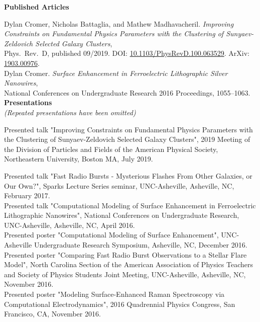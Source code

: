 \documentclass[letterpaper, 11pt]{article}
\newcommand{\noi}{\noindent}
\newcommand{\ind}{\indent}
\begin{document}
\noi \textbf{Published Articles}

\noi Dylan Cromer, Nicholas Battaglia, and Mathew Madhavacheril. \emph{Improving Constraints on Fundamental Physics Parameters with the Clustering of Sunyaev-Zeldovich Selected Galaxy Clusters},
\\
\ind Phys.\ Rev.\ D, published 09/2019. DOI: \href{https://doi.org/10.1103/PhysRevD.100.063529}{10.1103/PhysRevD.100.063529}. ArXiv: \href{https://arxiv.org/abs/1903.00976}{1903.00976}.
\\

\noi Dylan Cromer. \emph{Surface Enhancement in Ferroelectric Lithographic Silver Nanowires}, 
\\
	\ind National Conferences on Undergraduate Research 2016 Proceedings, 1055--1063.
\\

\noi \textbf{Presentations}
\\
\emph{(Repeated presentations have been omitted)}

\noi Presented talk "Improving Constraints on Fundamental Physics Parameters with the Clustering of Sunyaev-Zeldovich Selected Galaxy Clusters", 2019 Meeting of the Division of Particles and Fields of the American Physical Society, Northeastern University, Boston MA, July 2019.

\noi Presented talk "Fast Radio Bursts - Mysterious Flashes From Other Galaxies, or Our Own?", Sparks Lecture Series seminar, UNC-Asheville, Asheville, NC, February 2017.
\\

\noi Presented talk "Computational Modeling of Surface Enhancement in Ferroelectric Lithographic Nanowires", National Conferences on Undergraduate Research, UNC-Asheville, Asheville, NC, April 2016.
\\

\noi Presented poster "Computational Modeling of Surface Enhancement", UNC-Asheville Undergraduate Research Symposium, Asheville, NC, December 2016.
\\

\noi Presented poster "Comparing Fast Radio Burst Observations to a Stellar Flare Model", North Carolina Section of the American Association of Physics Teachers and Society of Physics Students Joint Meeting, UNC-Asheville, Asheville, NC, November 2016.
\\

\noi Presented poster "Modeling Surface-Enhanced Raman Spectroscopy via Computational Electrodynamics", 2016 Quadrennial Physics Congress, San Francisco, CA, November 2016.
\\
\end{document}
